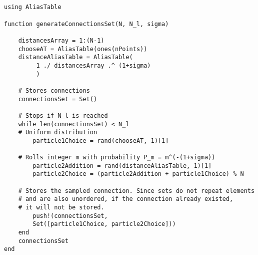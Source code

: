 \begin{lstlisting}


using AliasTable

function generateConnectionsSet(N, N_l, sigma)

    distancesArray = 1:(N-1)
    chooseAT = AliasTable(ones(nPoints))
    distanceAliasTable = AliasTable(
   		 1 ./ distancesArray .^ (1+sigma)
		 )

    # Stores connections
    connectionsSet = Set() 

    # Stops if N_l is reached
    while len(connectionsSet) < N_l
	# Uniform distribution
        particle1Choice = rand(chooseAT, 1)[1]

	# Rolls integer m with probability P_m = m^(-(1+sigma))
        particle2Addition = rand(distanceAliasTable, 1)[1]
        particle2Choice = (particle2Addition + particle1Choice) % N

	# Stores the sampled connection. Since sets do not repeat elements 
	# and are also unordered, if the connection already existed,
	# it will not be stored.
        push!(connectionsSet, 
		Set([particle1Choice, particle2Choice]))
    end
    connectionsSet
end

\end{lstlisting}
